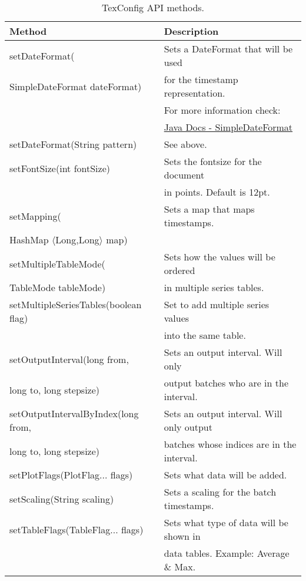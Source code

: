 \begin{table}[h]
\centering
\begin{tabular}[h]{|l|l|}\hline
	\textbf{Method} & \textbf{Description}\\
	\hline
	setDateFormat( & Sets a DateFormat that will be used\\
	SimpleDateFormat dateFormat) & for the timestamp representation.\\
	& For more information check:\\
	& \href{http://docs.oracle.com/javase/6/docs/api/java/text/SimpleDateFormat.html}{Java Docs - SimpleDateFormat}\\
	\hline
	setDateFormat(String pattern) & See above.\\
	\hline
	setFontSize(int fontSize) & Sets the fontsize for the document\\
	& in points. Default is 12pt.\\
	\hline
	setMapping( & Sets a map that maps timestamps.\\
	HashMap $\langle$Long,Long$\rangle$ map) &\\
	\hline
	setMultipleTableMode( & Sets how the values will be ordered\\
	TableMode tableMode) & in multiple series tables.\\
	\hline
	setMultipleSeriesTables(boolean flag) & Set to add multiple series values\\
	& into the same table.\\
	\hline
	setOutputInterval(long from,& Sets an output interval. Will only\\
	long to, long stepsize) & output batches who are in the interval.\\
	\hline
	setOutputIntervalByIndex(long from,& Sets an output interval. Will only output\\
	long to, long stepsize) & batches whose indices are in the interval.\\
	\hline
	setPlotFlags(PlotFlag... flags) & Sets what data will be added.\\
	\hline
	setScaling(String scaling) & Sets a scaling for the batch timestamps.\\
	\hline
	setTableFlags(TableFlag... flags) & Sets what type of data will be shown in\\
	& data tables. Example: Average \& Max.\\
	\hline
\end{tabular}
\caption{TexConfig API methods.}
\label{tab:tex-methods}
\end{table}

